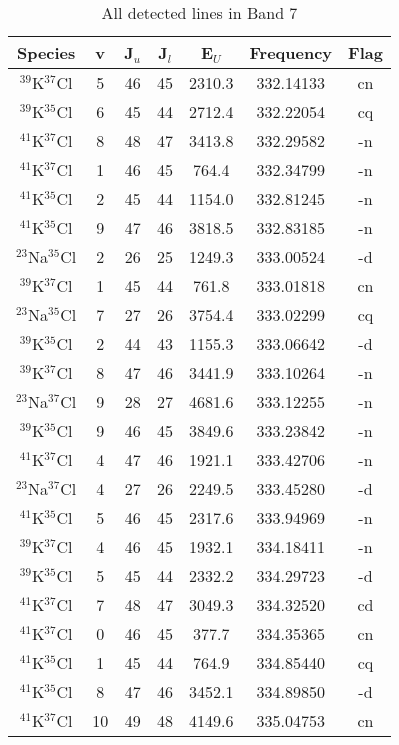 \begin{table*}[htp]
\centering
\caption{All detected lines in Band 7}
\begin{tabular}{ccccccc}
\label{tab:all_detections_B7}
Species & v & J$_u$ & J$_l$ & E$_U$ & Frequency & Flag \\
\hline
$^{39}$K$^{37}$Cl & 5 & 46 & 45 & 2310.3 & 332.14133 & cn \\
$^{39}$K$^{35}$Cl & 6 & 45 & 44 & 2712.4 & 332.22054 & cq \\
$^{41}$K$^{37}$Cl & 8 & 48 & 47 & 3413.8 & 332.29582 & -n \\
$^{41}$K$^{37}$Cl & 1 & 46 & 45 & 764.4 & 332.34799 & -n \\
$^{41}$K$^{35}$Cl & 2 & 45 & 44 & 1154.0 & 332.81245 & -n \\
$^{41}$K$^{35}$Cl & 9 & 47 & 46 & 3818.5 & 332.83185 & -n \\
$^{23}$Na$^{35}$Cl & 2 & 26 & 25 & 1249.3 & 333.00524 & -d \\
$^{39}$K$^{37}$Cl & 1 & 45 & 44 & 761.8 & 333.01818 & cn \\
$^{23}$Na$^{35}$Cl & 7 & 27 & 26 & 3754.4 & 333.02299 & cq \\
$^{39}$K$^{35}$Cl & 2 & 44 & 43 & 1155.3 & 333.06642 & -d \\
$^{39}$K$^{37}$Cl & 8 & 47 & 46 & 3441.9 & 333.10264 & -n \\
$^{23}$Na$^{37}$Cl & 9 & 28 & 27 & 4681.6 & 333.12255 & -n \\
$^{39}$K$^{35}$Cl & 9 & 46 & 45 & 3849.6 & 333.23842 & -n \\
$^{41}$K$^{37}$Cl & 4 & 47 & 46 & 1921.1 & 333.42706 & -n \\
$^{23}$Na$^{37}$Cl & 4 & 27 & 26 & 2249.5 & 333.45280 & -d \\
$^{41}$K$^{35}$Cl & 5 & 46 & 45 & 2317.6 & 333.94969 & -n \\
$^{39}$K$^{37}$Cl & 4 & 46 & 45 & 1932.1 & 334.18411 & -n \\
$^{39}$K$^{35}$Cl & 5 & 45 & 44 & 2332.2 & 334.29723 & -d \\
$^{41}$K$^{37}$Cl & 7 & 48 & 47 & 3049.3 & 334.32520 & cd \\
$^{41}$K$^{37}$Cl & 0 & 46 & 45 & 377.7 & 334.35365 & cn \\
$^{41}$K$^{35}$Cl & 1 & 45 & 44 & 764.9 & 334.85440 & cq \\
$^{41}$K$^{35}$Cl & 8 & 47 & 46 & 3452.1 & 334.89850 & -d \\
$^{41}$K$^{37}$Cl & 10 & 49 & 48 & 4149.6 & 335.04753 & cn \\

\end{tabular}
\end{table*}
